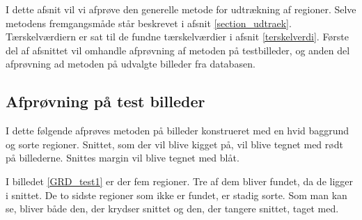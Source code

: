
{\sffamily I dette afsnit vil vi afprøve den generelle metode for udtrækning af
regioner. Selve metodens fremgangsmåde står beskrevet i afsnit
\ref{section_udtraek}. Tærskelværdiern er sat til de fundne
tærskelværdier i afsnit \ref{terskelverdi}. Første del af afsnittet vil
omhandle afprøvning af metoden på testbilleder, og anden del afprøvning
ad metoden på udvalgte billeder fra databasen.}

\subsection{Afprøvning på test billeder}
I dette følgende afprøves metoden på billeder konstrueret med en hvid
baggrund og sorte regioner. Snittet, som der vil blive kigget på, vil
blive tegnet med rødt på billederne. Snittes margin vil blive tegnet med blåt.

I billedet \ref{GRD_test1} er der fem regioner. Tre af dem bliver
fundet, da de ligger i snittet. De to sidste regioner som ikke er fundet, er
stadig sorte. Som man kan se, bliver både den, der krydser snittet og den,
der tangere snittet, taget med. 

\begin{figure}[!h]
    \centering
    	\hspace{1em}
		\hspace{1em}
        \caption[]{}
     \label{GRD_test1_sammen}
\end{figure}

